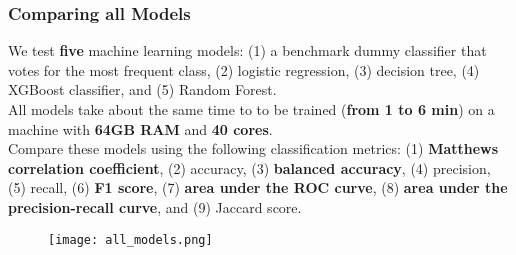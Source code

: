 \documentclass[11pt]{beamer}
\begin{document}
\begin{frame}[fragile]
  \frametitle{\normalsize{\textbf{
    Comparing all Models
  }}} 

  \scriptsize{  

    \textbullet \: We test \textbf{five} machine learning models: (1) a benchmark dummy 
    classifier that votes for the most frequent class, (2) logistic regression, 
    (3) decision tree, (4) XGBoost classifier, and (5) Random Forest. \\[0.25cm]
  
    \textbullet \: All models take about the same time to to be trained 
    (\textbf{from 1 to 6 min}) on a machine with \textbf{64GB RAM} and 
    \textbf{40 cores}. \\[0.25cm]
  
    \textbullet \: Compare these models using the following classification metrics: 
    (1) \textbf{Matthews correlation coefficient}, (2) accuracy, 
    (3) \textbf{balanced accuracy}, (4) precision, (5) recall, (6) \textbf{F1 score}, 
    (7) \textbf{area under the ROC curve}, (8) \textbf{area under the precision-recall curve}, 
    and (9) Jaccard score.

    \begin{figure}[h!]
      \centering
      \texttt{[image: all\_models.png]}
    \end{figure}  
  }
\end{frame}
\end{document}
